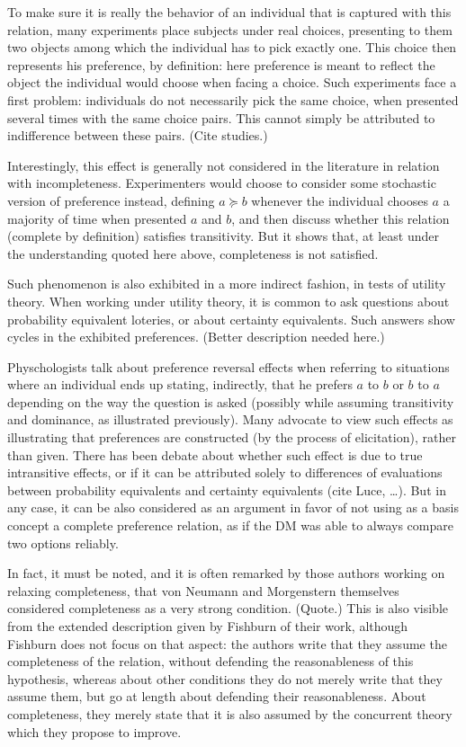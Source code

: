 \documentclass[french, english]{llncs}
\begin{document}
To make sure it is really the behavior of an individual that is captured with this relation, many experiments place subjects under real choices, presenting to them two objects among which the individual has to pick exactly one. This choice then represents his preference, by definition: here preference is meant to reflect the object the individual would choose when facing a choice. Such experiments face a first problem: individuals do not necessarily pick the same choice, when presented several times with the same choice pairs. This cannot simply be attributed to indifference between these pairs. (Cite studies.)

Interestingly, this effect is generally not considered in the literature in relation with incompleteness. Experimenters would choose to consider some stochastic version of preference instead, defining $a \succeq b$ whenever the individual chooses $a$ a majority of time when presented $a$ and $b$, and then discuss whether this relation (complete by definition) satisfies transitivity. But it shows that, at least under the understanding quoted here above, completeness is not satisfied.

Such phenomenon is also exhibited in a more indirect fashion, in tests of utility theory. When working under utility theory, it is common to ask questions about probability equivalent loteries, or about certainty equivalents. Such answers show cycles in the exhibited preferences. (Better description needed here.) 

Physchologists talk about preference reversal effects when referring to situations where an individual ends up stating, indirectly, that he prefers $a$ to $b$ or $b$ to $a$ depending on the way the question is asked (possibly while assuming transitivity and dominance, as illustrated previously). Many advocate to view such effects as illustrating that preferences are constructed (by the process of elicitation), rather than given. There has been debate about whether such effect is due to true intransitive effects, or if it can be attributed solely to differences of evaluations between probability equivalents and certainty equivalents (cite Luce, …). But in any case, it can be also considered as an argument in favor of not using as a basis concept a complete preference relation, as if the \ac{DM} was able to always compare two options reliably.

In fact, it must be noted, and it is often remarked by those authors working on relaxing completeness, that von Neumann and Morgenstern themselves considered completeness as a very strong condition. (Quote.) This is also visible from the extended description given by Fishburn of their work, although Fishburn does not focus on that aspect: the authors write that they assume the completeness of the relation, without defending the reasonableness of this hypothesis, whereas about other conditions they do not merely write that they assume them, but go at length about defending their reasonableness. About completeness, they merely state that it is also assumed by the concurrent theory which they propose to improve.
\end{document}
